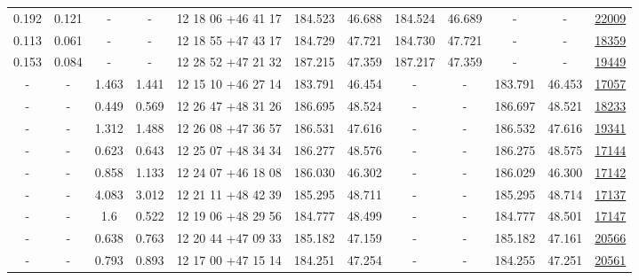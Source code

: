 \documentclass{article}
\begin{document}
\begin{landscape}
\begin{longtable}{c|c|c|c|c|c|c|c|c|c|c|c}
0.192 & 0.121 & - & - & 12 18 06 +46 41 17 &  184.523 & 46.688 &  184.524 & 46.689 & - & - & \href{http://banana.transientskp.org/r4/vlo_KmeulenTrap4P23/runningcatalog/22009}{22009}  \\
0.113 & 0.061 & - & - & 12 18 55 +47 43 17 &  184.729 & 47.721 &  184.730 & 47.721 & - & - & \href{http://banana.transientskp.org/r4/vlo_KmeulenTrap4P23/runningcatalog/18359}{18359}  \\
0.153 & 0.084 & - & - & 12 28 52 +47 21 32 &  187.215 & 47.359 &  187.217 & 47.359 & - & - & \href{http://banana.transientskp.org/r4/vlo_KmeulenTrap4P23/runningcatalog/19449}{19449}  \\
- & - & 1.463 & 1.441 & 12 15 10 +46 27 14 &  183.791 & 46.454 &  - & - & 183.791 & 46.453 & \href{http://banana.transientskp.org/r4/vlo_KmeulenTrap4P23/runningcatalog/17057}{17057}  \\
- & - & 0.449 & 0.569 & 12 26 47 +48 31 26 &  186.695 & 48.524 &  - & - & 186.697 & 48.521 & \href{http://banana.transientskp.org/r4/vlo_KmeulenTrap4P23/runningcatalog/18233}{18233}  \\
- & - & 1.312 & 1.488 & 12 26 08 +47 36 57 &  186.531 & 47.616 &  - & - & 186.532 & 47.616 & \href{http://banana.transientskp.org/r4/vlo_KmeulenTrap4P23/runningcatalog/19341}{19341}  \\
- & - & 0.623 & 0.643 & 12 25 07 +48 34 34 &  186.277 & 48.576 &  - & - & 186.275 & 48.575 & \href{http://banana.transientskp.org/r4/vlo_KmeulenTrap4P23/runningcatalog/17144}{17144}  \\
- & - & 0.858 & 1.133 & 12 24 07 +46 18 08 &  186.030 & 46.302 &  - & - & 186.029 & 46.300 & \href{http://banana.transientskp.org/r4/vlo_KmeulenTrap4P23/runningcatalog/17142}{17142}  \\
- & - & 4.083 & 3.012 & 12 21 11 +48 42 39 &  185.295 & 48.711 &  - & - & 185.295 & 48.714 & \href{http://banana.transientskp.org/r4/vlo_KmeulenTrap4P23/runningcatalog/17137}{17137}  \\
- & - & 1.6 & 0.522 & 12 19 06 +48 29 56 &  184.777 & 48.499 &  - & - & 184.777 & 48.501 & \href{http://banana.transientskp.org/r4/vlo_KmeulenTrap4P23/runningcatalog/17147}{17147}  \\
- & - & 0.638 & 0.763 & 12 20 44 +47 09 33 &  185.182 & 47.159 &  - & - & 185.182 & 47.161 & \href{http://banana.transientskp.org/r4/vlo_KmeulenTrap4P23/runningcatalog/20566}{20566}  \\
- & - & 0.793 & 0.893 & 12 17 00 +47 15 14 &  184.251 & 47.254 &  - & - & 184.255 & 47.251 & \href{http://banana.transientskp.org/r4/vlo_KmeulenTrap4P23/runningcatalog/20561}{20561}  \\

\end{longtable}
\end{landscape}
\end{document}
